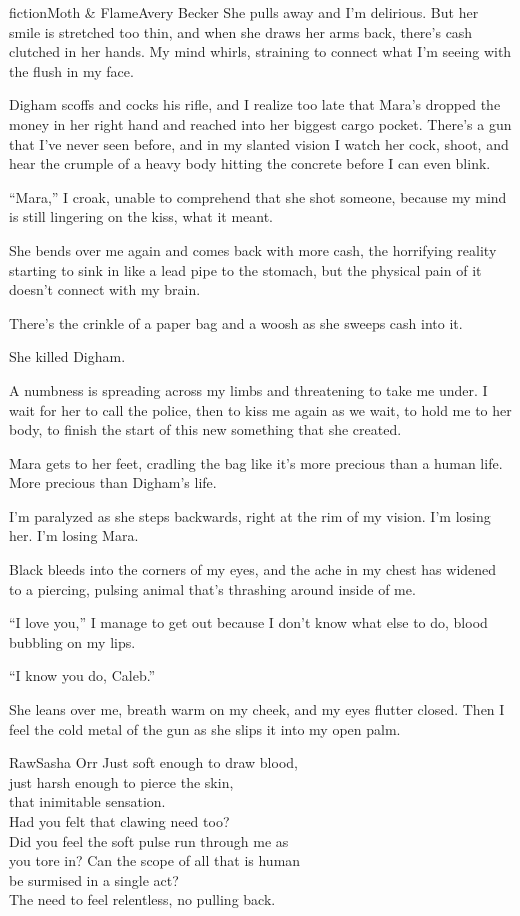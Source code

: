 \begin{prose}{fiction}{Moth \& Flame}{Avery Becker}
She pulls away and I'm delirious. But her smile is stretched too thin, and when she draws her arms back, there's cash clutched in her hands. My mind whirls, straining to connect what I'm seeing with the flush in my face.\par
Digham scoffs and cocks his rifle, and I realize too late that Mara's dropped the money in her right hand and reached into her biggest cargo pocket. There's a gun that I've never seen before, and in my slanted vision I watch her cock, shoot, and hear the crumple of a heavy body hitting the concrete before I can even blink. \par
“Mara,” I croak, unable to comprehend that she shot someone, because my mind is still lingering on the kiss, what it meant.\par
She bends over me again and comes back with more cash, the horrifying reality starting to sink in like a lead pipe to the stomach, but the physical pain of it doesn't connect with my brain. \par
There's the crinkle of a paper bag and a woosh as she sweeps cash into it. \par
She killed Digham.\par
A numbness is spreading across my limbs and threatening to take me under. I wait for her to call the police, then to kiss me again as we wait, to hold me to her body, to finish the start of this new something that she created.\par
Mara gets to her feet, cradling the bag like it's more precious than a human life. More precious than Digham's life.\par
I'm paralyzed as she steps backwards, right at the rim of my vision. I'm losing her. I'm losing Mara. \par
Black bleeds into the corners of my eyes, and the ache in my chest has widened to a piercing, pulsing animal that's thrashing around inside of me. \par
“I love you,” I manage to get out because I don't know what else to do, blood bubbling on my lips.\par
“I know you do, Caleb.” \par
She leans over me, breath warm on my cheek, and my eyes flutter closed. Then I feel the cold metal of the gun as she slips it into my open palm.
\end{prose}


\begin{poetry}{Raw}{Sasha Orr}
Just soft enough to draw blood,\\
just harsh enough to pierce the skin,\\
that inimitable sensation.\\
Had you felt that clawing need too?\\
Did you feel the soft pulse run through me as\\
you tore in? Can the scope of all that is human\\
be surmised in a single act?\\
The need to feel relentless, no pulling back.
\end{poetry}

